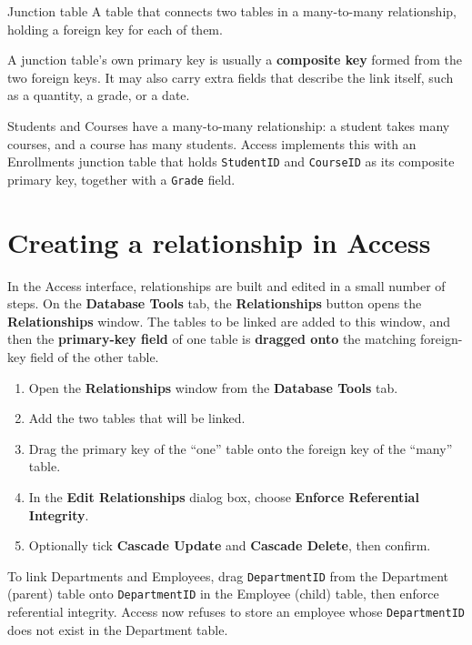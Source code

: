\begin{definitionbox}{Junction table}
A table that connects two tables in a many-to-many relationship, holding a
foreign key for each of them.
\end{definitionbox}

A junction table's own primary key is usually a \textbf{composite key} formed
from the two foreign keys. It may also carry extra fields that describe the
link itself, such as a quantity, a grade, or a date.

\begin{example}
Students and Courses have a many-to-many relationship: a student takes many
courses, and a course has many students. Access implements this with an
Enrollments junction table that holds \texttt{StudentID} and \texttt{CourseID}
as its composite primary key, together with a \texttt{Grade} field.
\end{example}

\section{Creating a relationship in Access}
In the Access interface, relationships are built and edited in a small number
of steps. On the \textbf{Database Tools} tab, the \textbf{Relationships} button
opens the \textbf{Relationships} window. The tables to be linked are added to
this window, and then the \textbf{primary-key field} of one table is
\textbf{dragged onto} the matching foreign-key field of the other table.

\begin{enumerate}
  \item Open the \textbf{Relationships} window from the \textbf{Database Tools}
    tab.
  \item Add the two tables that will be linked.
  \item Drag the primary key of the ``one'' table onto the foreign key of the
    ``many'' table.
  \item In the \textbf{Edit Relationships} dialog box, choose
    \textbf{Enforce Referential Integrity}.
  \item Optionally tick \textbf{Cascade Update} and \textbf{Cascade Delete},
    then confirm.
\end{enumerate}

\begin{example}
To link Departments and Employees, drag \texttt{DepartmentID} from the
Department (parent) table onto \texttt{DepartmentID} in the Employee (child)
table, then enforce referential integrity. Access now refuses to store an
employee whose \texttt{DepartmentID} does not exist in the Department table.
\end{example}

